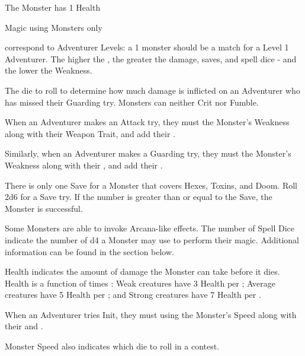 {\footnotesize 
\Asterisk The Monster has 1 Health 

\Dagger Magic using Monsters only
\normalsize


\HD correspond to Adventurer Levels: a 1 \HD monster should be a match for a Level 1 Adventurer.  The higher the \HD, the greater the damage, saves, and spell dice - and the lower the Weakness.


The die to roll to determine how much damage is inflicted on an Adventurer who has missed their Guarding try. Monsters can neither Crit nor Fumble.


When an Adventurer makes an Attack try, they must \RO the Monster's Weakness along with their Weapon Trait, and add their \LVL. 

Similarly, when an Adventurer makes a Guarding try, they must \RO the Monster's Weakness along with their \DEX, and add their \LVL.


There is only one Save for a Monster that covers Hexes, Toxins, and Doom. Roll 2d6 for a Save try. If the number is greater than or equal to the Save, the Monster is successful. 
 

Some Monsters are able to invoke Arcana-like effects. The number of Spell Dice indicate the number of d4 a Monster may use to perform their magic. Additional information can be found in the  section below.


Health indicates the amount of damage the Monster can take before it dies. Health is a function of  times : Weak creatures have 3 Health per \HD; Average creatures have 5 Health per \HD; and Strong creatures have 7 Health per \HD. 


When an Adventurer tries Init, they must \RO using the Monster's Speed along with their \INT and \MD.

Monster Speed also indicates which die to roll in a \RB{\DEX} contest.


}
